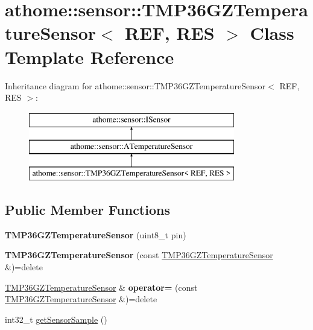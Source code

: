 \hypertarget{classathome_1_1sensor_1_1_t_m_p36_g_z_temperature_sensor}{}\section{athome\+:\+:sensor\+:\+:T\+M\+P36\+G\+Z\+Temperature\+Sensor$<$ R\+EF, R\+ES $>$ Class Template Reference}
\label{classathome_1_1sensor_1_1_t_m_p36_g_z_temperature_sensor}
Inheritance diagram for athome\+:\+:sensor\+:\+:T\+M\+P36\+G\+Z\+Temperature\+Sensor$<$ R\+EF, R\+ES $>$\+:\begin{figure}[H]
\begin{center}
\leavevmode
\includegraphics[height=3.000000cm]{classathome_1_1sensor_1_1_t_m_p36_g_z_temperature_sensor}
\end{center}
\end{figure}
\subsection*{Public Member Functions}
\begin{DoxyCompactItemize}
\item 
\mbox{\label{classathome_1_1sensor_1_1_t_m_p36_g_z_temperature_sensor_a8da15abb0144a1074956dc39a10b0d8c}} 
{\bfseries T\+M\+P36\+G\+Z\+Temperature\+Sensor} (uint8\+\_\+t pin)
\item 
\mbox{\label{classathome_1_1sensor_1_1_t_m_p36_g_z_temperature_sensor_ac5a99d97f0a19f10bb5cba8dc22d620b}} 
{\bfseries T\+M\+P36\+G\+Z\+Temperature\+Sensor} (const \mbox{\hyperlink{classathome_1_1sensor_1_1_t_m_p36_g_z_temperature_sensor}{T\+M\+P36\+G\+Z\+Temperature\+Sensor}} \&)=delete
\item 
\mbox{\label{classathome_1_1sensor_1_1_t_m_p36_g_z_temperature_sensor_a56a451e62807f163dba052f35adc6bc7}} 
\mbox{\hyperlink{classathome_1_1sensor_1_1_t_m_p36_g_z_temperature_sensor}{T\+M\+P36\+G\+Z\+Temperature\+Sensor}} \& {\bfseries operator=} (const \mbox{\hyperlink{classathome_1_1sensor_1_1_t_m_p36_g_z_temperature_sensor}{T\+M\+P36\+G\+Z\+Temperature\+Sensor}} \&)=delete
\item 
int32\+\_\+t \mbox{\hyperlink{classathome_1_1sensor_1_1_t_m_p36_g_z_temperature_sensor_ae0e101ee54c5c64842d2cab9fb9292f4}{get\+Sensor\+Sample}} ()
\end{DoxyCompactItemize}
